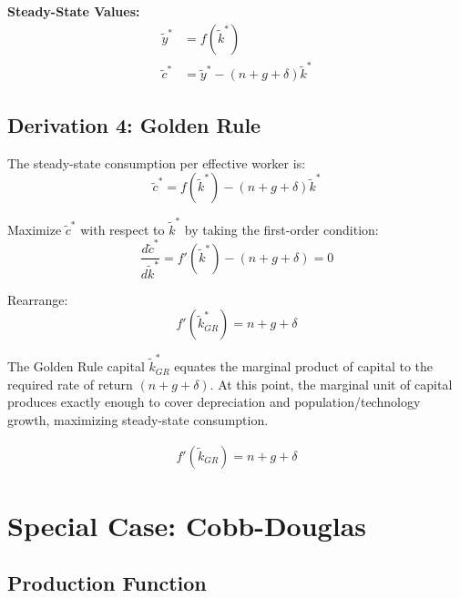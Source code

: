 \documentclass[a4paper,11pt]{article}
\newcommand{\ktilde}{\tilde{k}}
\newcommand{\ytilde}{\tilde{y}}
\newcommand{\ctilde}{\tilde{c}}
\begin{document}
\medskip
\noindent \textbf{Steady-State Values:}
\begin{align}
\ytilde^* &= f(\ktilde^*) \\
\ctilde^* &= \ytilde^* - (n + g + \delta)\ktilde^*
\end{align}

\subsection{Derivation 4: Golden Rule}

\begin{derivationbox}
The steady-state consumption per effective worker is:
\[
\ctilde^* = f(\ktilde^*) - (n+g+\delta)\ktilde^*
\]

Maximize $\ctilde^*$ with respect to $\ktilde^*$ by taking the first-order condition:
\[
\frac{d\ctilde^*}{d\ktilde^*} = f'(\ktilde^*) - (n+g+\delta) = 0
\]

Rearrange:
\[
f'(\ktilde^*_{GR}) = n+g+\delta
\]

The Golden Rule capital $\ktilde^*_{GR}$ equates the marginal product of capital to the required rate of return $(n+g+\delta)$. At this point, the marginal unit of capital produces exactly enough to cover depreciation and population/technology growth, maximizing steady-state consumption.
\end{derivationbox}

\begin{resultbox}
\begin{align*}
\boxed{f'(\ktilde_{GR}) = n + g + \delta}
\tag{GR}
\end{align*}
\end{resultbox}

\clearpage

\section{Special Case: Cobb-Douglas}

\subsection*{Production Function}
\end{document}
